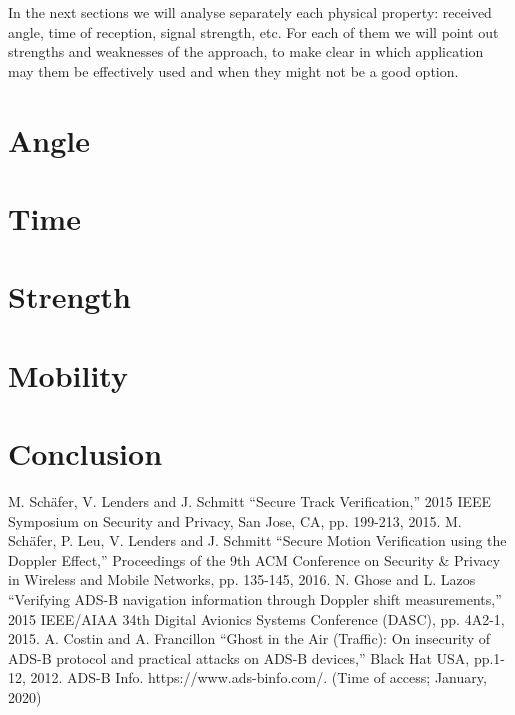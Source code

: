 \documentclass[conference]{IEEEtran}
\begin{document}
In the next sections we will analyse separately each physical property: received angle, time of reception, signal strength, etc. For each of them we will point out strengths and weaknesses of the approach, to make clear in which application may them be effectively used and when they might not be a good option.

\section{Angle}
%

\section{Time}


\section{Strength}
%

\section{Mobility}


\section{Conclusion}

\begin{thebibliography}{00}
 M. Schäfer, V. Lenders and J. Schmitt ``Secure Track Verification,'' 2015 IEEE Symposium on Security and Privacy, San Jose, CA, pp. 199-213, 2015.
 M. Schäfer, P. Leu, V. Lenders and J. Schmitt ``Secure Motion Verification using the Doppler Effect,'' Proceedings of the 9th ACM Conference on Security \& Privacy in Wireless and Mobile Networks, pp. 135-145, 2016.
 N. Ghose and L. Lazos ``Verifying ADS-B navigation information through Doppler shift measurements,'' 2015 IEEE/AIAA 34th Digital Avionics Systems Conference (DASC), pp. 4A2-1, 2015.
 A. Costin and A. Francillon ``Ghost in the Air (Traffic): On insecurity of ADS-B protocol and practical attacks on ADS-B devices,'' Black Hat USA, pp.1-12, 2012.
ADS-B Info. https://www.ads-binfo.com/. (Time of access; January, 2020)
\end{thebibliography}
\end{document}
